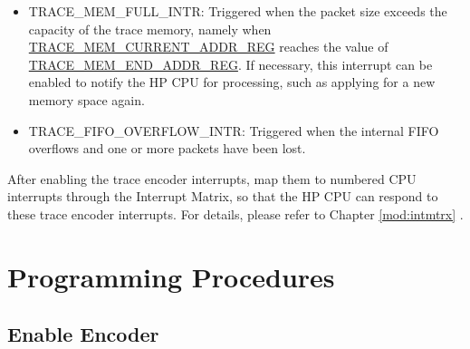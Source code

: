 \documentclass[main\_\_EN.tex]{subfiles}
\begin{document}
\begin{itemize}
    \item TRACE\_MEM\_FULL\_INTR: Triggered when the packet size exceeds the capacity of the trace memory, namely when \hyperref[regdesc:TRACEMEMCURRENTADDRREG]{TRACE\_MEM\_CURRENT\_ADDR\_REG} reaches the value of \hyperref[regdesc:TRACEMEMENDADDRREG]{TRACE\_MEM\_END\_ADDR\_REG}. If necessary, this interrupt can be enabled to notify the HP CPU for processing, such as applying for a new memory space again.
    \item TRACE\_FIFO\_OVERFLOW\_INTR: Triggered when the internal FIFO overflows and one or more packets have been lost.
\end{itemize}


After enabling the trace encoder interrupts, map them to numbered CPU interrupts through the Interrupt Matrix, so that the HP CPU can respond to these trace encoder interrupts. For details, please refer to Chapter \ref{mod:intmtrx} \textit{}.


\section{Programming Procedures}
\label{sec:riscvtracenc-prog-procedures}

\subsection{Enable Encoder}
\end{document}
